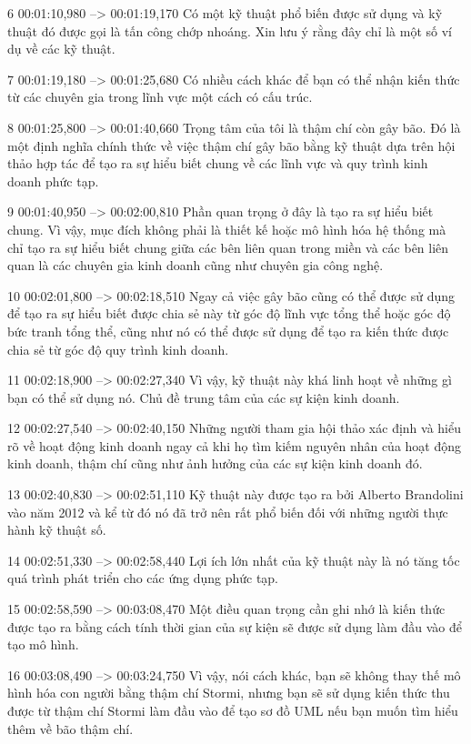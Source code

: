 6
00:01:10,980 --> 00:01:19,170
Có một kỹ thuật phổ biến được sử dụng và kỹ thuật đó được gọi là tấn công chớp nhoáng.  Xin lưu ý rằng đây chỉ là một số ví dụ về các kỹ thuật.

7
00:01:19,180 --> 00:01:25,680
Có nhiều cách khác để bạn có thể nhận kiến ​​thức từ các chuyên gia trong lĩnh vực một cách có cấu trúc.

8
00:01:25,800 --> 00:01:40,660
Trọng tâm của tôi là thậm chí còn gây bão.  Đó là một định nghĩa chính thức về việc thậm chí gây bão bằng kỹ thuật dựa trên hội thảo hợp tác để tạo ra sự hiểu biết chung về các lĩnh vực và quy trình kinh doanh phức tạp.

9
00:01:40,950 --> 00:02:00,810
Phần quan trọng ở đây là tạo ra sự hiểu biết chung.  Vì vậy, mục đích không phải là thiết kế hoặc mô hình hóa hệ thống mà chỉ tạo ra sự hiểu biết chung giữa các bên liên quan trong miền và các bên liên quan là các chuyên gia kinh doanh cũng như chuyên gia công nghệ.

10
00:02:01,800 --> 00:02:18,510
Ngay cả việc gây bão cũng có thể được sử dụng để tạo ra sự hiểu biết được chia sẻ này từ góc độ lĩnh vực tổng thể hoặc góc độ bức tranh tổng thể, cũng như nó có thể được sử dụng để tạo ra kiến ​​thức được chia sẻ từ góc độ quy trình kinh doanh.

11
00:02:18,900 --> 00:02:27,340
Vì vậy, kỹ thuật này khá linh hoạt về những gì bạn có thể sử dụng nó.  Chủ đề trung tâm của các sự kiện kinh doanh.

12
00:02:27,540 --> 00:02:40,150
Những người tham gia hội thảo xác định và hiểu rõ về hoạt động kinh doanh ngay cả khi họ tìm kiếm nguyên nhân của hoạt động kinh doanh, thậm chí cũng như ảnh hưởng của các sự kiện kinh doanh đó.

13
00:02:40,830 --> 00:02:51,110
Kỹ thuật này được tạo ra bởi Alberto Brandolini vào năm 2012 và kể từ đó nó đã trở nên rất phổ biến đối với những người thực hành kỹ thuật số.

14
00:02:51,330 --> 00:02:58,440
Lợi ích lớn nhất của kỹ thuật này là nó tăng tốc quá trình phát triển cho các ứng dụng phức tạp.

15
00:02:58,590 --> 00:03:08,470
Một điều quan trọng cần ghi nhớ là kiến ​​thức được tạo ra bằng cách tính thời gian của sự kiện sẽ được sử dụng làm đầu vào để tạo mô hình.

16
00:03:08,490 --> 00:03:24,750
Vì vậy, nói cách khác, bạn sẽ không thay thế mô hình hóa con người bằng thậm chí Stormi, nhưng bạn sẽ sử dụng kiến ​​thức thu được từ thậm chí Stormi làm đầu vào để tạo sơ đồ UML nếu bạn muốn tìm hiểu thêm về bão thậm chí.

